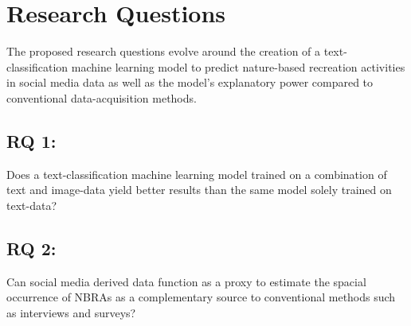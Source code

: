 \chapter{Research Questions} \label{research_questions}
The proposed research questions evolve around the creation of a text-classification machine learning model to predict nature-based recreation activities in social media data as well as the model's explanatory power compared to conventional data-acquisition methods.

\section{RQ 1:}
Does a text-classification machine learning model trained on a combination of text and image-data yield better results than the same model solely trained on text-data?

\section{RQ 2:}
Can social media derived data function as a proxy to estimate the spacial occurrence of NBRAs as a complementary source to conventional methods such as interviews and surveys?




